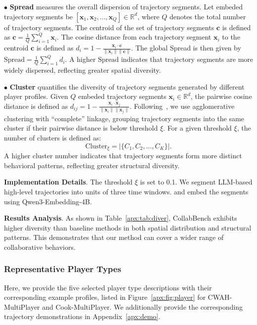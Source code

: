 \documentclass{article}
\theoremstyle{plain}
\theoremstyle{definition}
\theoremstyle{remark}
\begin{document}
$\bullet$ \textbf{Spread} measures the overall dispersion of trajectory segments. Let embeded trajectory segments be $[\mathbf{x}_1, \mathbf{x}_2, \dots, \mathbf{x}_Q] \in \mathbb{R}^d$, where $Q$ denotes the total number of trajectory segments. The centroid of the set of trajectory segments $\mathbf{c}$ is defined as $\mathbf{c}=\frac{1}{Q}\sum_{i=1}^Q{\mathbf{x}_i}$. The cosine distance from each trajectory segment $\mathbf{x}_i$ to the centroid $\mathbf{c}$ is defined as $d_i = 1 - \frac{\mathbf{x}_i \cdot \mathbf{c}}{\|\mathbf{x}_i\|  \|\mathbf{c}\|}$. The global Spread is then given by $\text{Spread}=\frac{1}{Q}\sum_{i=1}^Q{d_i}$. A higher $\text{Spread}$ indicates that trajectory segments are more widely dispersed, reflecting greater spatial diversity.

$\bullet$ \textbf{Cluster} quantifies the diversity of trajectory segments generated by different player profiles. Given $Q$ embeded trajectory segments $\mathbf{x}_i \in \mathbb{R}^d$, the pairwise cosine distance is defined as $d_{ij} = 1 - \frac{\mathbf{x}_i \cdot \mathbf{x}_j}{\|\mathbf{x}_i\|  \|\mathbf{x}_j\|} $. 
Following~\cite{2024agglomerative}, we use agglomerative clustering with ``complete'' linkage, grouping trajectory segments into the same cluster if their pairwise distance is below threshold $\xi$. For a given threshold $\xi$, the number of clusters is defined as:
\begin{equation}
    \text{Cluster}_\xi = \bigl| \{ C_1, C_2, \dots, C_K \} \bigr|.
\end{equation}
A higher cluster number indicates that trajectory segments form more distinct behavioral patterns, reflecting greater structural diversity.

\textbf{Implementation Details}. The threshold $\xi$ is set to 0.1. We segment LLM-based high-level trajectories into units of three time windows. and embed the segments using Qwen3-Embedding-4B.


\textbf{Results Analysis}. As shown in Table~\ref{apx:tab:diver}, CollabBench exhibits higher diversity than baseline methods in both spatial distribution and structural patterns. This demonstrates that our method can cover a wider range of collaborative behaviors.

\subsubsection{Representative Player Types}\label{apx:type}
Here, we provide the five selected player type descriptions with their corresponding example profiles, listed in Figure~\ref{apx:fig:player} for CWAH-MultiPlayer and Cook-MultiPlayer. We additionally provide the corresponding trajectory demonstrations in Appendix~\ref{apx:demo}.
\end{document}
